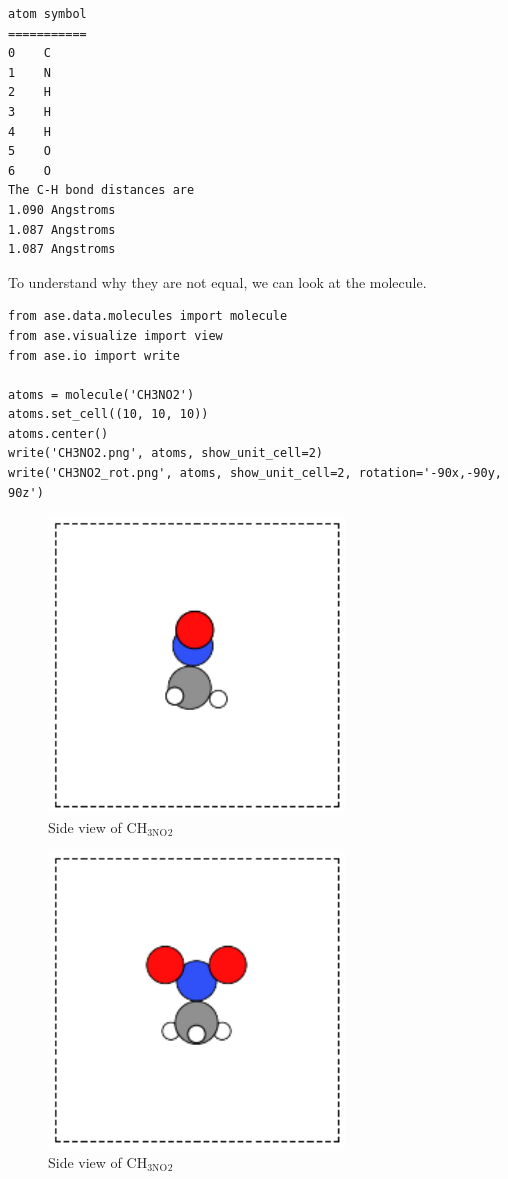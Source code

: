 \documentclass[11pt]{article}
\begin{document}
\begin{verbatim}
atom symbol
===========
0    C
1    N
2    H
3    H
4    H
5    O
6    O
The C-H bond distances are
1.090 Angstroms
1.087 Angstroms
1.087 Angstroms
\end{verbatim}

To understand why they are not equal, we can look at the molecule.


\begin{verbatim}
from ase.data.molecules import molecule
from ase.visualize import view
from ase.io import write

atoms = molecule('CH3NO2')
atoms.set_cell((10, 10, 10))
atoms.center()
write('CH3NO2.png', atoms, show_unit_cell=2)
write('CH3NO2_rot.png', atoms, show_unit_cell=2, rotation='-90x,-90y, 90z')
\end{verbatim}


\begin{figure}[H]
\centering
\includegraphics[width=0.7\textwidth]{./CH3NO2.png}
\caption{Side view of CH$_{\mathrm{3NO}}$$_2$}
\end{figure}
\begin{figure}[H]
\centering
\includegraphics[width=0.7\textwidth]{./CH3NO2_rot.png}
\caption{Side view of CH$_{\mathrm{3NO}}$$_2$}
\end{figure}
\end{document}
